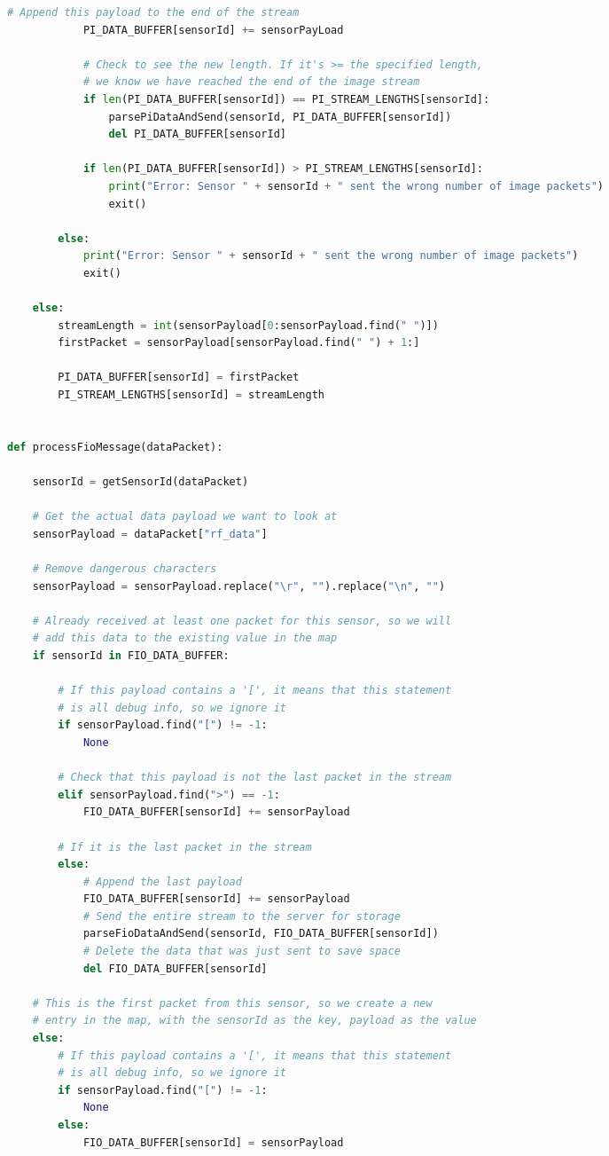 \documentclass[11pt, oneside, fullpage, doublespace]{article}
\begin{document}
\begin{spacing}{1}
\begin{lstlisting}[language=python]
			# Append this payload to the end of the stream
			PI_DATA_BUFFER[sensorId] += sensorPayLoad

			# Check to see the new length. If it's >= the specified length,
			# we know we have reached the end of the image stream
			if len(PI_DATA_BUFFER[sensorId]) == PI_STREAM_LENGTHS[sensorId]:
				parsePiDataAndSend(sensorId, PI_DATA_BUFFER[sensorId])
				del PI_DATA_BUFFER[sensorId]

			if len(PI_DATA_BUFFER[sensorId]) > PI_STREAM_LENGTHS[sensorId]:
				print("Error: Sensor " + sensorId + " sent the wrong number of image packets")
				exit()
		
		else:
			print("Error: Sensor " + sensorId + " sent the wrong number of image packets")
			exit()
				
	else:
		streamLength = int(sensorPayload[0:sensorPayload.find(" ")])
		firstPacket = sensorPayload[sensorPayload.find(" ") + 1:]

		PI_DATA_BUFFER[sensorId] = firstPacket
		PI_STREAM_LENGTHS[sensorId] = streamLength


def processFioMessage(dataPacket):

	sensorId = getSensorId(dataPacket)

	# Get the actual data payload we want to look at
	sensorPayload = dataPacket["rf_data"]

	# Remove dangerous characters
	sensorPayload = sensorPayload.replace("\r", "").replace("\n", "")

	# Already received at least one packet for this sensor, so we will
	# add this data to the existing value in the map
	if sensorId in FIO_DATA_BUFFER:
		
		# If this payload contains a '[', it means that this statement
		# is all debug info, so we ignore it
		if sensorPayload.find("[") != -1: 
			None
		
		# Check that this payload is not the last packet in the stream
		elif sensorPayload.find(">") == -1: 
			FIO_DATA_BUFFER[sensorId] += sensorPayload
		
		# If it is the last packet in the stream
		else:
			# Append the last payload
			FIO_DATA_BUFFER[sensorId] += sensorPayload
			# Send the entire stream to the server for storage
			parseFioDataAndSend(sensorId, FIO_DATA_BUFFER[sensorId])
			# Delete the data that was just sent to save space
			del FIO_DATA_BUFFER[sensorId]

	# This is the first packet from this sensor, so we create a new
	# entry in the map, with the sensorId as the key, payload as the value
	else:
		# If this payload contains a '[', it means that this statement
		# is all debug info, so we ignore it
		if sensorPayload.find("[") != -1:
			None
		else:
			FIO_DATA_BUFFER[sensorId] = sensorPayload		


\end{lstlisting}
\end{spacing}
\end{document}
